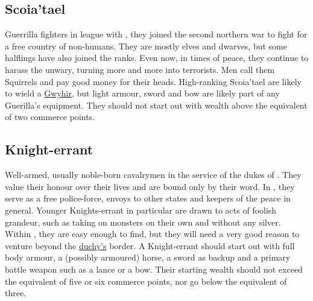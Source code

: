 \documentclass[parskip=full,11pt,%
footheight=38pt]{scrreport}
\begin{document}
\subsection{Scoia'tael}\label{profession:scoiatael}
Guerrilla fighters in league with , they joined the second northern war to fight for a free country of non-humans.
They are mostly elves and dwarves, but some halflings have also joined the ranks. Even now, in times of peace, they continue to harass the
unwary, turning more and more into terrorists. Men call them Squirrels and pay good money for their heads. High-ranking Scoia'tael are
likely to wield a \hyperref[weapon:gwyhir]{Gwyhir}, but light armour, sword and bow are likely part of any Guerilla's equipment.
They should not start out with wealth above the equivalent of two commerce points.

\subsection{Knight-errant}\label{profession:knight_errant}
Well-armed, usually noble-born cavalrymen in the service of the dukes of . They value their honour over their lives and are
bound only by their word. In , they serve as a free police-force, envoys to other states and keepers of the peace in general.
Younger Knights-errant in particular are drawn to acts of foolish grandeur, such as taking on monsters on their own and without any silver. Within
, they are easy enough to find, but they will need a very good reason to venture beyond the \hyperref[realm:toussaint]{duchy's} border.
A Knight-errant should start out with full body armour, a (possibly armoured) horse, a sword as backup and a primary battle weapon such as a lance or
a bow. Their starting wealth should not exceed the equivalent of five or six commerce points, nor go below the equivalent of three.
\end{document}
